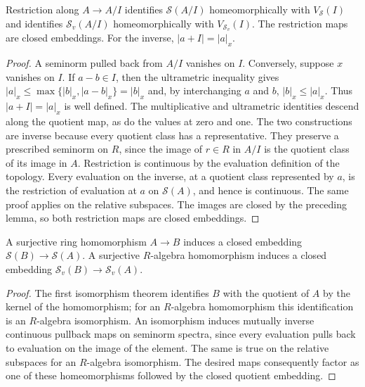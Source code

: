 \begin{theorem}\label{spectrum:quotient-homeomorphism}
\leanok
{}
Restriction along $A\to A/I$ identifies $\mathcal S(A/I)$ homeomorphically
with $V_{\mathcal S}(I)$ and identifies $\mathcal S_v(A/I)$ homeomorphically
with $V_{\mathcal S_v}(I)$. The restriction maps are closed embeddings.
For the inverse, $|a+I|=|a|_x$.
\end{theorem}
\begin{proof}
A seminorm pulled back from $A/I$ vanishes on $I$. Conversely, suppose $x$ vanishes
on $I$. If $a-b\in I$, then the ultrametric inequality gives
$|a|_x\le\max\{|b|_x,|a-b|_x\}=|b|_x$ and, by interchanging $a$ and $b$,
$|b|_x\le|a|_x$. Thus $|a+I|=|a|_x$ is well defined.
The multiplicative and ultrametric identities descend along the quotient map,
as do the values at zero and one. The two constructions are inverse because
every quotient class has a representative. They preserve a prescribed seminorm
on $R$, since the image of $r\in R$ in $A/I$ is the quotient class of its image
in $A$. Restriction is continuous by the evaluation definition of the topology.
Every evaluation on the inverse, at a quotient class represented by $a$, is
the restriction of evaluation at $a$ on $\mathcal S(A)$, and hence is continuous.
The same proof applies on the relative subspaces. The images are closed by
the preceding lemma, so both restriction maps are closed embeddings.
\end{proof}

\begin{theorem}\label{spectrum:surjective-closed-embedding}
\leanok
{}
A surjective ring homomorphism $A\to B$ induces a closed embedding
$\mathcal S(B)\to\mathcal S(A)$. A surjective $R$-algebra homomorphism
induces a closed embedding $\mathcal S_v(B)\to\mathcal S_v(A)$.
\end{theorem}
\begin{proof}
The first isomorphism theorem identifies $B$ with the quotient of $A$ by the
kernel of the homomorphism; for an $R$-algebra homomorphism this identification
is an $R$-algebra isomorphism. An isomorphism induces mutually inverse
continuous pullback maps on seminorm spectra, since every evaluation pulls back
to evaluation on the image of the element. The same is true on the relative
subspaces for an $R$-algebra isomorphism. The desired maps consequently factor
as one of these homeomorphisms followed by the closed quotient embedding.
\end{proof}

